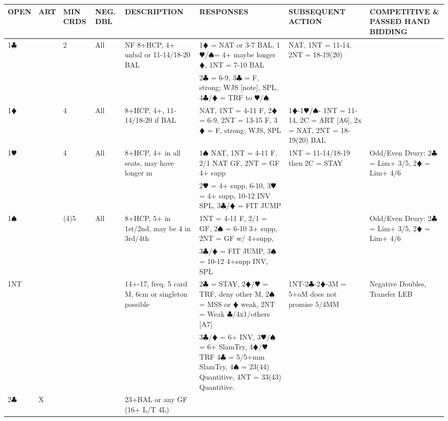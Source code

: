 \documentclass{article}
\newcommand\C{\ensuremath{\clubsuit}}
\newcommand\D{\color{red}\ensuremath{\vardiamondsuit}}
\renewcommand\H{\color{red}\ensuremath{\varheartsuit}}
\renewcommand\S{\ensuremath{\spadesuit}}
\newcommand\N{{\footnotesize NT}}
\begin{document}
\noindent
\begin{tabular}{| p{9mm} | p{6mm} | p{6mm} | p{6mm} | p{58mm} | p{62mm} | p{58mm} | p{48mm} |}
	\hline
	\cellcolor{green!25} \textbf{OPEN} & \cellcolor{green!25} \textbf{ART} & \cellcolor{green!25} \textbf{MIN CRDS} & \cellcolor{green!25} \textbf{NEG. DBL} & \cellcolor{green!25} \textbf{DESCRIPTION} & \cellcolor{green!25} \textbf{RESPONSES} & \cellcolor{green!25} \textbf{SUBSEQUENT ACTION} & \cellcolor{green!25} \textbf{COMPETITIVE \& PASSED HAND BIDDING} \\ \hline
	1\C & & 2 & All
			& NF 8+HCP, 4+ unbal or 11-14/18-20 BAL
			& 1{\D} = NAT or 3-7 BAL, 1{\H}/{\S}= 4+ maybe longer {\D}, 1NT = 7-10 BAL 
			& NAT, 1NT = 11-14, 2NT = 18-19(20)
			& \\ \hline
	& & & & & 2{\C} = 6-9, 3{\C} = F, strong; WJS [note], SPL, 4{\C}/{\D} = TRF to {\H}/{\S}& & \\ \hline
	1\D & & 4 & All 
			& 8+HCP, 4+, 11-14/18-20 if BAL 
			& NAT, 1NT = 4-11 F, 2{\D} = 6-9, 2{\N} = 13-15 F, 3{\D} = F, strong; WJS, SPL
			& 1{\D}-1{\H}/{\S}- 1NT = 11-14, 2C = ART [A6], 2x = NAT, 2NT = 18-19(20) BAL & \\ \hline
	1\H & & 4 & All 
			& 8+HCP, 4+ in all seats, may have longer m
			& 1{\S} NAT, 1NT = 4-11 F, 2/1 NAT GF, 2NT = GF 4+ supp 
			& 1NT = 11-14/18-19 then 2C = STAY
			& Odd/Even Drury: 2{\C} = Lim+ 3/5, 2{\D} = Lim+ 4/6\\ \hline
	& & & & & 2{\H} = 4+ supp, 6-10, 3{\H} = 4+ supp, 10-12 INV 
			SPL, 3{\C}/{\D} = FIT JUMP& & \\ \hline
	1\S & & (4)5 & All 
			& 8+HCP, 5+ in 1st/2nd, may be 4 in 3rd/4th 
			& 1NT = 4-11 F, 2/1 = GF, 2{\S} = 6-10 3+ supp,
			2NT = GF w/ 4+supp,
			& 
			& Odd/Even Drury: 2{\C} = Lim+ 3/5, 2{\D} = Lim+ 4/6\\ \hline
	& & & & &  3{\C}/{\D} = FIT JUMP, 3{\S} = 10-12 4+supp INV, SPL& & \\ \hline
	1\N & & & & 14+-17, freq. 5 card M, 6cm or singleton possible 
			& 2{\C} = STAY, 2{\D}/{\H} = TRF, deny other M, 2{\S} = MSS or {\D} weak, 2{\N} = Weak {\C}/4x1/others [A7]
			& 1{\N}-2{\C}-2{\D}-3M = 5+oM does not promise 5/4MM
			& Negative Doubles, Transfer LEB\\ \hline
	& & & & & 3{\C}/{\D} = 6+ INV, 3{\H}/{\S} = 6+ SlamTry, 4{\D}/{\H} TRF
			4{\C} = 5/5+mm SlamTry, 4{\S} = 23(44) Quantitive, 4{\N} = 33(43) Quantitive.
			& & \\ \hline
	2\C & X & & 
			& 23+BAL or any GF (16+ L/T 4L) 

\end{tabular}
\end{document}

